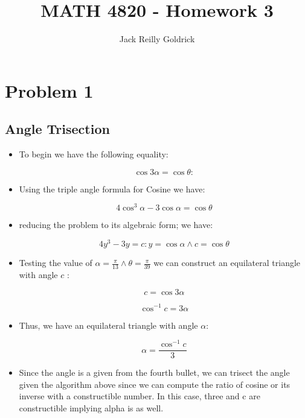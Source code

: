 \documentclass[]{report}
\title{MATH 4820 - Homework 3}
\author{Jack Reilly Goldrick}
\begin{document}
	\maketitle
	
	
	\section{Problem 1}
	
	\subsection{Angle Trisection}
	\begin{itemize}
		
		\item To begin we have the following equality:
		
		$$ \cos{3 \alpha}  = \cos{\theta} : $$
		
		\item Using the triple angle formula for Cosine we have:
		
		$$ 4 \cos^3{\alpha}  - 3  \cos{\alpha} = \cos{\theta} $$ 
		
		\item reducing the problem to its algebraic form; we have:
		
		$$ 4  y^3 - 3 y = c : y = \cos{\alpha} \land c = \cos{\theta}  $$
		
		\item Testing the value of $\alpha = \frac{\pi}{13}  \land \theta = \frac{\pi}{39} $ we  can construct an equilateral triangle with angle $c$ :
		
		$$ c = \cos{3 \alpha} $$
		
		$$ \cos^{-1}{c} = 3 \alpha $$
		
		\item Thus, we have an equilateral triangle with angle $\alpha$: 
		
		$$ \alpha = \frac{\cos^{-1}{c}}{3}$$ 
		
		
		\item Since the angle is a given from the fourth bullet, we can trisect the angle given the algorithm above since we can compute the ratio of  cosine or its inverse with a constructible number. In this case, three and c are constructible implying alpha is as well.
		
	\begin{flushright}
		\smiley{}
	\end{flushright}

		
	\end{itemize}
	
\end{document}
